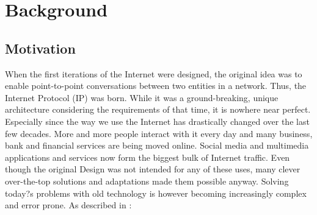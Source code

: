 \chapter{Background} \label{chapter:Background}



\section{Motivation}


When the first iterations of the Internet were designed, the original idea was to enable point-to-point conversations between two entities in a network. Thus, the Internet Protocol (IP) was born. While it was a ground-breaking, unique architecture considering the requirements of that time, it is nowhere near perfect. Especially since the way we use the Internet has drastically changed over the last few decades. More and more people interact with it every day and many business, bank and financial services are being moved online. Social media and multimedia applications and services now form the biggest bulk of Internet traffic.%
Even though the original Design was not intended for any of these uses, many clever over-the-top solutions and adaptations made them possible anyway. Solving today?s problems with old technology is however becoming increasingly complex and error prone. As described in \cite{ZEBJ10}: \\

